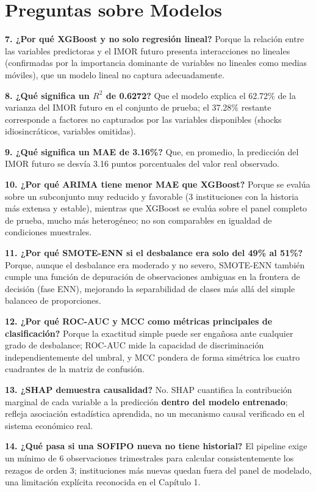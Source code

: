 \section*{Preguntas sobre Modelos}
\textbf{7. ¿Por qué XGBoost y no solo regresión lineal?} Porque la relación entre las variables predictoras y el IMOR futuro presenta interacciones no lineales (confirmadas por la importancia dominante de variables no lineales como medias móviles), que un modelo lineal no captura adecuadamente.

\textbf{8. ¿Qué significa un $R^2$ de 0.6272?} Que el modelo explica el 62.72\% de la varianza del IMOR futuro en el conjunto de prueba; el 37.28\% restante corresponde a factores no capturados por las variables disponibles (shocks idiosincráticos, variables omitidas).

\textbf{9. ¿Qué significa un MAE de 3.16\%?} Que, en promedio, la predicción del IMOR futuro se desvía 3.16 puntos porcentuales del valor real observado.

\textbf{10. ¿Por qué ARIMA tiene menor MAE que XGBoost?} Porque se evalúa sobre un subconjunto muy reducido y favorable (3 instituciones con la historia más extensa y estable), mientras que XGBoost se evalúa sobre el panel completo de prueba, mucho más heterogéneo; no son comparables en igualdad de condiciones muestrales.

\textbf{11. ¿Por qué SMOTE-ENN si el desbalance era solo del 49\% al 51\%?} Porque, aunque el desbalance era moderado y no severo, SMOTE-ENN también cumple una función de depuración de observaciones ambiguas en la frontera de decisión (fase ENN), mejorando la separabilidad de clases más allá del simple balanceo de proporciones.

\textbf{12. ¿Por qué ROC-AUC y MCC como métricas principales de clasificación?} Porque la exactitud simple puede ser engañosa ante cualquier grado de desbalance; ROC-AUC mide la capacidad de discriminación independientemente del umbral, y MCC pondera de forma simétrica los cuatro cuadrantes de la matriz de confusión.

\textbf{13. ¿SHAP demuestra causalidad?} No. SHAP cuantifica la contribución marginal de cada variable a la predicción \textbf{dentro del modelo entrenado}; refleja asociación estadística aprendida, no un mecanismo causal verificado en el sistema económico real.

\textbf{14. ¿Qué pasa si una SOFIPO nueva no tiene historial?} El pipeline exige un mínimo de 6 observaciones trimestrales para calcular consistentemente los rezagos de orden 3; instituciones más nuevas quedan fuera del panel de modelado, una limitación explícita reconocida en el Capítulo 1.

